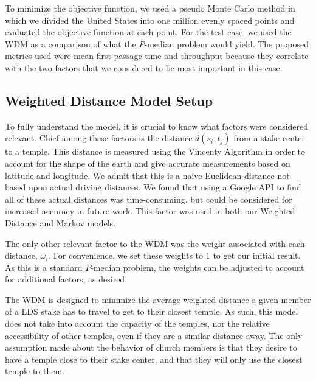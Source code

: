\documentclass[twoside,twocolumn]{article}
\begin{document}
To minimize the objective function, we used a pseudo Monte Carlo method in which we divided the United States into one million evenly spaced points and evaluated the objective function at each point.
For the test case, we used the WDM as a comparison of what the $P$-median problem would yield.
The proposed metrics used were mean first passage time and throughput because they correlate with the two factors that we considered to be most important in this case.
\subsection{Weighted Distance Model Setup}

To fully understand the model, it is crucial to know what factors were considered relevant.
Chief among these factors is the distance $d(s_i,t_j)$ from a stake center to a temple. %
This distance is measured using the Vincenty Algorithm in order to account for the shape of the earth and give accurate measurements based on latitude and longitude. %
We admit that this is a naive Euclidean distance not based upon actual driving distances.
We found that using a Google API to find all of these actual distances was time-consuming, but could be considered for increased accuracy in future work. %
This factor was used in both our Weighted Distance and Markov models.

The only other relevant factor to the WDM was the weight associated with each distance, $\omega_i$. %
For convenience, we set these weights to $1$ to get our initial result.
As this is a standard $P$-median problem, the weights can be adjusted to account for additional factors, as desired.

The WDM is designed to minimize the average weighted distance a given member of a LDS stake has to travel to get to their closest temple.
As such, this model does not take into account the capacity of the temples, nor the relative accessibility of other temples, even if they are a similar distance away.
The only assumption made about the behavior of church members is that they desire to have a temple close to their stake center, and that they will only use the closest temple to them. %
\end{document}
